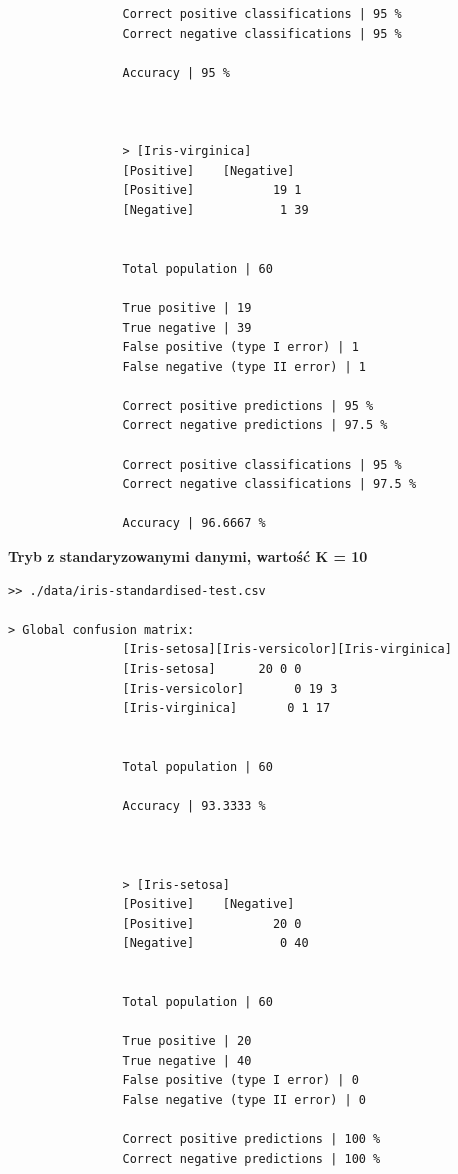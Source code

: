 \documentclass{classrep}
\begin{document}
{{{\begin{lstlisting}
                Correct positive classifications | 95 %
                Correct negative classifications | 95 %

                Accuracy | 95 %



                > [Iris-virginica]
                [Positive]    [Negative]
                [Positive]           19 1
                [Negative]            1 39


                Total population | 60

                True positive | 19
                True negative | 39
                False positive (type I error) | 1
                False negative (type II error) | 1

                Correct positive predictions | 95 %
                Correct negative predictions | 97.5 %

                Correct positive classifications | 95 %
                Correct negative classifications | 97.5 %

                Accuracy | 96.6667 %

                \end{lstlisting}
                \textbf{Tryb z standaryzowanymi danymi, wartość K = 10}
                \begin{lstlisting}
>> ./data/iris-standardised-test.csv

> Global confusion matrix:
                [Iris-setosa][Iris-versicolor][Iris-virginica]
                [Iris-setosa]      20 0 0
                [Iris-versicolor]       0 19 3
                [Iris-virginica]       0 1 17


                Total population | 60

                Accuracy | 93.3333 %



                > [Iris-setosa]
                [Positive]    [Negative]
                [Positive]           20 0
                [Negative]            0 40


                Total population | 60

                True positive | 20
                True negative | 40
                False positive (type I error) | 0
                False negative (type II error) | 0

                Correct positive predictions | 100 %
                Correct negative predictions | 100 %


\end{lstlisting}}}}
\end{document}
